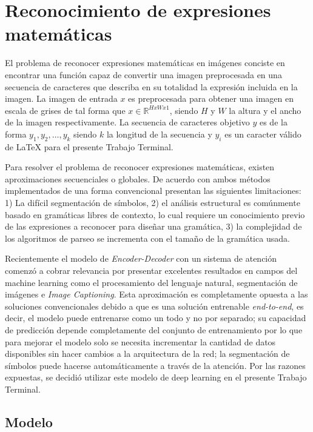 \newpage
\section{Reconocimiento de expresiones matemáticas}

El problema de reconocer expresiones matemáticas en imágenes conciste en encontrar una función capaz de convertir una imagen preprocesada en una secuencia de caracteres que describa en su totalidad la expresión incluida en la imagen. La imagen de entrada $x$ es preprocesada para obtener una imagen en escala de grises de tal forma que $x \in \mathbb{R} ^ {H x W x 1}$, siendo $H$ y $W$ la altura y el ancho de la imagen respectivamente. La secuencia de caracteres objetivo $y$ es de la forma $y_{1}, y_{2}, \dots , y_{k}$ siendo $k$ la longitud de la secuencia y $y_{i}$ es un caracter válido de \LaTeX{} para el presente Trabajo Terminal.

Para resolver el problema de reconocer expresiones matemáticas, existen aproximaciones secuenciales o globales. De acuerdo con \cite{superprecision} ambos métodos implementados de una forma convencional presentan las siguientes limitaciones: 1) La difícil segmentación de símbolos, 2) el análisis estructural es comúnmente basado en gramáticas libres de contexto, lo cual requiere un conocimiento previo de las expresiones a reconocer para diseñar una gramática, 3) la complejidad de los algoritmos de parseo se incrementa con el tamaño de la gramática usada.

Recientemente el modelo de \textit{Encoder-Decoder} con un sistema de atención comenzó a cobrar relevancia por presentar excelentes resultados en campos del machine learning como el procesamiento del lenguaje natural, segmentación de imágenes e \textit{Image Captioning}. Esta aproximación es completamente opuesta a las soluciones convencionales debido a que es una solución entrenable \textit{end-to-end}, es decir, el modelo puede entrenarse como un todo y no por separado; su capacidad de predicción depende completamente del conjunto de entrenamiento por lo que para mejorar el modelo solo se necesita incrementar la cantidad de datos disponibles sin hacer cambios a la arquitectura de la red; la segmentación de símbolos puede hacerse automáticamente a través de la atención. Por las razones expuestas, se decidió utilizar este modelo de deep learning en el presente Trabajo Terminal.

\subsection{Modelo}

